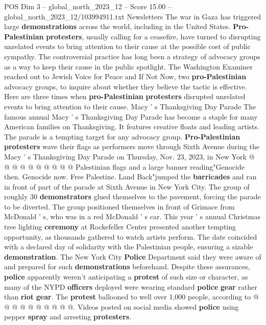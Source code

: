 \begin{textsample}{POS Dim 3 – global\_north\_2023\_12 – Score 15.00 – global\_north\_2023\_12/103994911.txt}  \label{ex:f3_pos_224}
Newsletters The war in Gaza has triggered large \textbf{demonstrations} across the world, including in the United States. \textbf{Pro-Palestinian} \textbf{protesters}, usually calling for a ceasefire, have turned to disrupting unrelated events to bring attention to their cause at the possible cost of public sympathy.
The controversial practice has long been a strategy of advocacy groups as a way to keep their cause in the public spotlight.
The Washington Examiner reached out to Jewish Voice for Peace and If Not Now, two \textbf{pro-Palestinian} advocacy groups, to inquire about whether they believe the tactic is effective.
Here are three times when \textbf{pro-Palestinian} \textbf{protesters} disrupted unrelated events to bring attention to their cause.
Macy ' s Thanksgiving Day Parade The famous annual Macy ' s Thanksgiving Day Parade has become a staple for many American families on Thanksgiving.
It features creative floats and leading artists.
The parade is a tempting target for any advocacy group. \textbf{Pro-Palestinian} \textbf{protesters} wave their flags as performers move through Sixth Avenue during the Macy ' s Thanksgiving Day Parade on Thursday, Nov. 23, 2023, in New York @ @ @ @ @ @ @ @ @ @ Palestinian flags and a large banner reading"Genocide then.
Genocide now.
Free Palestine.
Land Back"jumped the \textbf{barricades} and ran in front of part of the parade at Sixth Avenue in New York City.
The group of roughly 30 \textbf{demonstrators} glued themselves to the pavement, forcing the parade to be diverted.
The group positioned themselves in front of Grimace from McDonald ' s, who was in a red McDonald ' s car.
This year ' s annual Christmas tree lighting \textbf{ceremony} at Rockefeller Center presented another tempting opportunity, as thousands gathered to watch artists perform.
The date coincided with a declared day of solidarity with the Palestinian people, ensuring a sizable \textbf{demonstration}.
The New York City \textbf{Police} Department said they were aware of and prepared for such \textbf{demonstrations} beforehand.
Despite these assurances, \textbf{police} apparently weren't anticipating a \textbf{protest} of such size or character, as many of the NYPD \textbf{officers} deployed were wearing standard \textbf{police} \textbf{gear} rather than \textbf{riot} \textbf{gear}.
The \textbf{protest} ballooned to well over 1,000 people, according to @ @ @ @ @ @ @ @ @ @.
Videos posted on social media showed \textbf{police} using pepper \textbf{spray} and arresting \textbf{protesters}.

\end{textsample}
